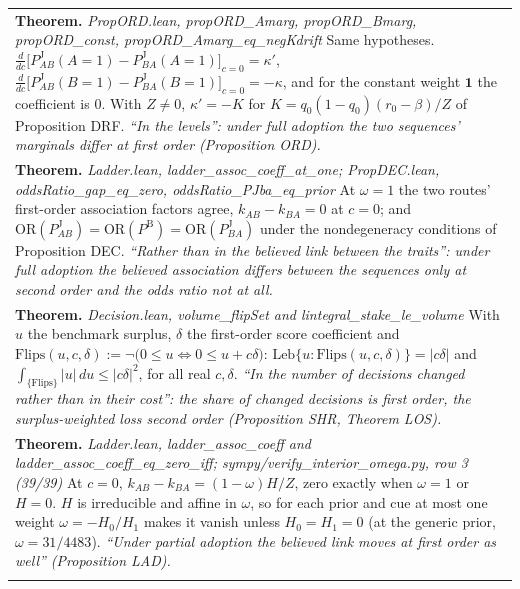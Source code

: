 \documentclass[10pt]{article}
\theoremstyle{definition}
\newcommand{\PB}{P^{\mathrm{B}}}
\newcommand{\PJ}{P^{\mathrm{J}}}
\newlength{\fullw}\setlength{\fullw}{25.9cm}
\begin{document}
{\begin{longtable}{|p{0.9cm}|p{12.2cm}|p{12.2cm}|}
\multicolumn{3}{|p{\fullw}|}{\textbf{Theorem.} \textit{PropORD.lean, propORD\_Amarg, propORD\_Bmarg, propORD\_const, propORD\_Amarg\_eq\_negKdrift} \newline Same hypotheses. $\frac{d}{dc}\bigl[\PJ_{AB}(A{=}1)-\PJ_{BA}(A{=}1)\bigr]_{c=0}=\kappa'$,
$\frac{d}{dc}\bigl[\PJ_{AB}(B{=}1)-\PJ_{BA}(B{=}1)\bigr]_{c=0}=-\kappa$, and for the
constant weight $\mathbf 1$ the coefficient is $0$. With $Z\neq0$,
$\kappa'=-K$ for $K=q_0(1-q_0)(r_0-\beta)/Z$ of Proposition DRF. \newline \textit{``In the levels'': under full adoption the two sequences' marginals differ at first order (Proposition ORD).}} \\
\multicolumn{3}{|p{\fullw}|}{\textbf{Theorem.} \textit{Ladder.lean, ladder\_assoc\_coeff\_at\_one; PropDEC.lean, oddsRatio\_gap\_eq\_zero, oddsRatio\_PJba\_eq\_prior} \newline At $\omega=1$ the two routes' first-order association factors agree,
$k_{AB}-k_{BA}=0$ at $c=0$; and $\mathrm{OR}(\PJ_{AB})=\mathrm{OR}(\PB)=\mathrm{OR}(\PJ_{BA})$
under the nondegeneracy conditions of Proposition DEC. \newline \textit{``Rather than in the believed link between the traits'': under full adoption the believed association differs between the sequences only at second order and the odds ratio not at all.}} \\
\multicolumn{3}{|p{\fullw}|}{\textbf{Theorem.} \textit{Decision.lean, volume\_flipSet and lintegral\_stake\_le\_volume} \newline With $u$ the benchmark surplus, $\delta$ the first-order score
coefficient and $\mathrm{Flips}(u,c,\delta) := \neg\big(0\le u \iff 0\le u + c\delta\big)$:
$\mathrm{Leb}\{u : \mathrm{Flips}(u,c,\delta)\} = |c\delta|$ and
$\int_{\{\mathrm{Flips}\}} |u|\,du \le |c\delta|^2$, for all real $c,\delta$. \newline \textit{``In the number of decisions changed rather than in their cost'': the share of changed decisions is first order, the surplus-weighted loss second order (Proposition SHR, Theorem LOS).}} \\
\multicolumn{3}{|p{\fullw}|}{\textbf{Theorem.} \textit{Ladder.lean, ladder\_assoc\_coeff and ladder\_assoc\_coeff\_eq\_zero\_iff; sympy/verify\_interior\_omega.py, row 3 (39/39)} \newline At $c=0$, $k_{AB}-k_{BA}=(1-\omega)H/Z$, zero exactly when $\omega=1$ or $H=0$. $H$ is
irreducible and affine in $\omega$, so for each prior and cue at most one weight
$\omega=-H_0/H_1$ makes it vanish unless $H_0=H_1=0$ (at the generic prior, $\omega=31/4483$). \newline \textit{``Under partial adoption the believed link moves at first order as well'' (Proposition LAD).}} \\ \hline
\multicolumn{3}{|l|}{} \\ \hline
\end{longtable}
}
\end{document}
